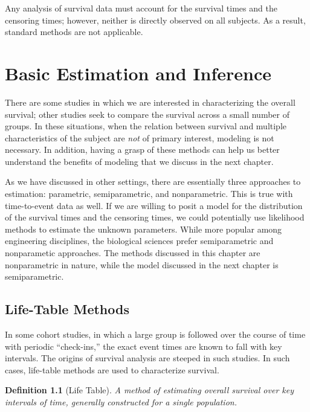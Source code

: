 \documentclass[
]{book}
\theoremstyle{plain}
\theoremstyle{mydefn}
\newtheorem{definition}{Definition}[chapter]
\theoremstyle{myexmpl}
\theoremstyle{remark}
\begin{document}
Any analysis of survival data must account for the survival times and the censoring times; however, neither is directly observed on all subjects. As a result, standard methods are not applicable.

\hypertarget{surv-basic}{%
\chapter{Basic Estimation and Inference}\label{surv-basic}}

There are some studies in which we are interested in characterizing the overall survival; other studies seek to compare the survival across a small number of groups. In these situations, when the relation between survival and multiple characteristics of the subject are \emph{not} of primary interest, modeling is not necessary. In addition, having a grasp of these methods can help us better understand the benefits of modeling that we discuss in the next chapter.

As we have discussed in other settings, there are essentially three approaches to estimation: parametric, semiparametric, and nonparametric. This is true with time-to-event data as well. If we are willing to posit a model for the distribution of the survival times and the censoring times, we could potentially use likelihood methods to estimate the unknown parameters. While more popular among engineering disciplines, the biological sciences prefer semiparametric and nonparametic approaches. The methods discussed in this chapter are nonparametric in nature, while the model discussed in the next chapter is semiparametric.

\hypertarget{life-table-methods}{%
\section{Life-Table Methods}\label{life-table-methods}}

In some cohort studies, in which a large group is followed over the course of time with periodic ``check-ins,'' the exact event times are known to fall with key intervals. The origins of survival analysis are steeped in such studies. In such cases, life-table methods are used to characterize survival.

\begin{definition}[Life Table]
A method of estimating overall survival over key intervals of time, generally constructed for a single population.
\end{definition}
\end{document}
